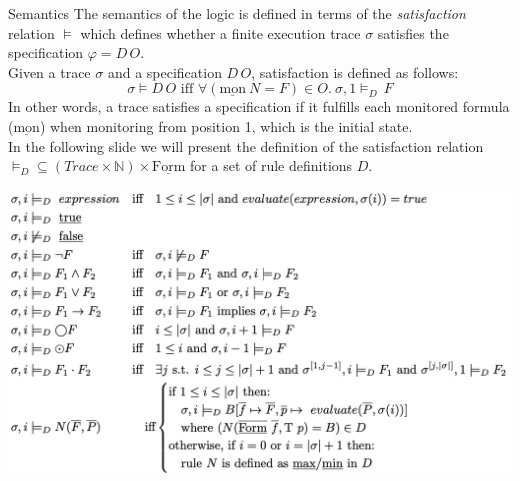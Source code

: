 \documentclass[aspectratio=169,t,xcolor=table]{beamer}
\begin{document}
\begin{frame}[allowframebreaks]{Semantics}
    The semantics of the logic is defined in terms of the \textit{satisfaction} relation $\models$ which defines whether a finite execution trace $\sigma$ satisfies the specification $\varphi=D \, O$.\\
    \vspace*{5mm}
    Given a trace $\sigma$ and a specification $D \, O$, satisfaction is defined as follows:
    \[
    \sigma \models D \, O \text{ iff } \forall (\underline{\text{mon}}\ N = F) \in O.\ \sigma ,1 \models_D \, F
    \]
    In other words, a trace satisfies a specification if it fulfills each monitored formula ($\underline{\text{mon}}$) when monitoring from position 1, which is the initial state.\\
    \vspace*{5mm}
    In the following slide we will present the definition of the satisfaction relation $\models_D \subseteq (Trace \times \mathbb{N}) \times \underline{\text{Form}}$ for a set of rule definitions $D$. 

    \includegraphics[scale=0.27]{images/semantics.png}
\end{frame}
\end{document}
